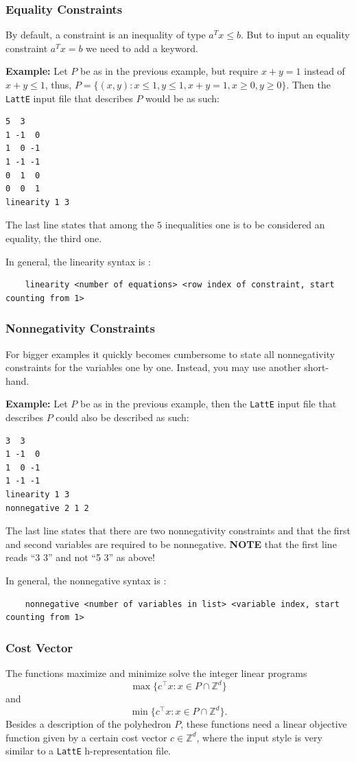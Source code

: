\documentclass{article}
\newcommand{\Z}{{\mathbb Z}}
\newcommand{\latte}{{\tt LattE}\xspace}
\newcommand{\example}{{\bf Example:\space}}
\begin{document}
\subsubsection{Equality Constraints}

By default, a constraint is an inequality of type $a^Tx\leq b$. But to input an equality constraint $a^Tx=b$ we need to add a keyword.

\example
Let $P$ be as in the previous example, but require $x+y=1$ instead of
$x+y\leq 1$, thus, 
$P=\{(x,y): x\leq 1, y\leq 1, x+y=1, x\geq 0, y\geq 0\}$.
Then the {\tt LattE} input file that describes $P$ would be as such:
\begin{verbatim}
5  3
1 -1  0
1  0 -1
1 -1 -1
0  1  0
0  0  1
linearity 1 3
\end{verbatim}
The last line states that among the $5$ inequalities one is to be
considered an equality, the third one.

In general, the linearity syntax is :
\begin{verbatim}
	linearity <number of equations> <row index of constraint, start counting from 1>
\end{verbatim}

\subsubsection{Nonnegativity Constraints}
For bigger examples it quickly becomes cumbersome to state all
nonnegativity constraints for the variables one by one. Instead, you
may use another short-hand.

\example
Let $P$ be as in the previous example, then the {\tt LattE} input file
that describes $P$ could also be described as such: 
\begin{verbatim}
3  3
1 -1  0
1  0 -1
1 -1 -1
linearity 1 3
nonnegative 2 1 2
\end{verbatim}
The last line states that there are two nonnegativity constraints and
that the first and second variables are required to be nonnegative. 
{\bf NOTE} that the first line reads ``3 3'' and not ``5 3'' as above! 

In general, the nonnegative syntax is :
\begin{verbatim}
	nonnegative <number of variables in list> <variable index, start counting from 1>
\end{verbatim}


\subsubsection{Cost Vector}
The functions maximize and minimize solve the integer linear programs
\[
\max\{c^\intercal x: x\in P\cap\Z^d\}
\]
and
\[
\min\{c^\intercal x: x\in P\cap\Z^d\}.
\]
Besides a description of the polyhedron $P$, these functions need a
linear objective function given by a certain cost vector $c \in \Z^d$, where the input style is very similar to a \latte h-representation file. 
\end{document}
